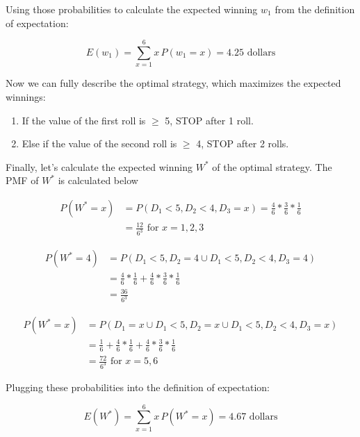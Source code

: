 Using those probabilities to calculate the expected winning $w_1$ from the definition of expectation:

$$E(w_1) = \sum_{x=1}^6 x \, P(w_1=x) = 4.25 \text{ dollars}$$


Now we can fully describe the optimal strategy, which maximizes the expected winnings:

\begin{enumerate}
\item If the value of the first roll is $\ge$ 5, STOP after 1 roll.

\item Else if the value of the second roll is $\ge$ 4, STOP after 2 rolls.
\end{enumerate}


Finally, let's calculate the expected winning $W^*$ of the optimal strategy.
The PMF of $W^*$ is calculated below

\begin{equation*}
\begin{split}
    P(W^*=x) & = P(D_1<5 , D_2<4 , D_3=x) = \frac{4}{6} * \frac{3}{6} * \frac{1}{6}\\
    & = \frac{12}{6^3} \text{ for } x=1,2,3
\end{split}
\end{equation*}

\begin{equation*}
\begin{split}
    P(W^*=4) & = P(D_1<5 , D_2=4 \cup D_1<5 , D_2<4 , D_3=4)\\
    & = \frac{4}{6}*\frac{1}{6} + \frac{4}{6}*\frac{3}{6}*\frac{1}{6}\\
    & = \frac{36}{6^3}
\end{split}
\end{equation*}

\begin{equation*}
\begin{split}
    P(W^*=x) & = P(D_1=x \cup D_1<5,D_2=x \cup D_1<5,D_2<4,D_3=x)\\
    & = \frac{1}{6} + \frac{4}{6}*\frac{1}{6} + \frac{4}{6}*\frac{3}{6}*\frac{1}{6}\\
    & = \frac{72}{6^3} \text{ for } x=5,6
\end{split}
\end{equation*}


Plugging these probabilities into the definition of expectation:

$$E(W^*) = \sum_{x=1}^6 x \, P(W^* = x) = 4.67 \text{ dollars}$$

